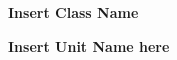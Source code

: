 \documentclass[a4paper]{article}
\begin{document}
	\setlength{\parindent}{1cm}
	\begin{center}
		{\bf \Large Insert Class Name}
	\end{center}
	\begin{TitleBox}
		\begin{center}
			{\bf Insert Unit Name here}
		\end{center}
	\end{TitleBox}
\end{document}
